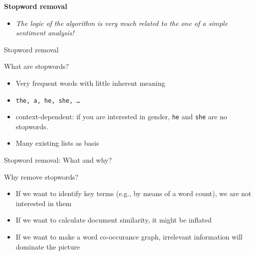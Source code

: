 \documentclass[handout]{beamer}
\begin{document}

\begin{frame}
	\textbf{Stopword removal} \\
	\vspace{1cm}
	\begin{itemize}
		\item <2->{\emph{The logic of the algorithm is very much related to the one of a simple sentiment analysis!}}
	\end{itemize}
\end{frame}

\begin{frame}{Stopword removal}
	\begin{block}{What are stopwords?}
		\begin{itemize}
			\item Very frequent words with little inherent meaning
			\item \texttt{the, a, he, she, \ldots}
			\item context-dependent: if you are interested in gender, \texttt{he} and \texttt{she} are no stopwords. 
			\item Many existing lists as basis
		\end{itemize}
	\end{block}
	
\end{frame}

\begin{frame}{Stopword removal: What and why?}
	\begin{block}{Why remove stopwords?}
		\begin{itemize}
			\item If we want to identify key terms (e.g., by means of a word count), we are not interested in them
			\item If we want to calculate document similarity, it might be inflated
			\item If we want to make a word co-occurance graph, irrelevant information will dominate the picture
		\end{itemize}
	\end{block}
\end{frame}
\end{document}
